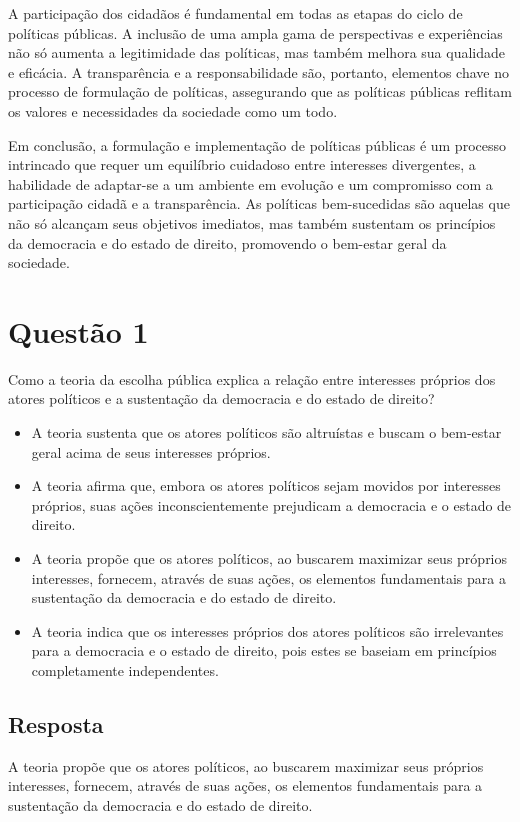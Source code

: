 \documentclass[
   article,       
   12pt,          
   oneside,       
   a4paper,       
   english,       
   brazil,        
   sumario=tradicional
   ]{abntex2}
\begin{document}
A participação dos cidadãos é fundamental em todas as etapas do ciclo de políticas públicas. A inclusão de uma ampla gama de perspectivas e experiências não só aumenta a legitimidade das políticas, mas também melhora sua qualidade e eficácia. A transparência e a responsabilidade são, portanto, elementos chave no processo de formulação de políticas, assegurando que as políticas públicas reflitam os valores e necessidades da sociedade como um todo.

Em conclusão, a formulação e implementação de políticas públicas é um processo intrincado que requer um equilíbrio cuidadoso entre interesses divergentes, a habilidade de adaptar-se a um ambiente em evolução e um compromisso com a participação cidadã e a transparência. As políticas bem-sucedidas são aquelas que não só alcançam seus objetivos imediatos, mas também sustentam os princípios da democracia e do estado de direito, promovendo o bem-estar geral da sociedade.
\section{Questão 1}
Como a teoria da escolha pública explica a relação entre interesses próprios dos atores políticos e a sustentação da democracia e do estado de direito?

\begin{itemize}
  \item A teoria sustenta que os atores políticos são altruístas e buscam o bem-estar geral acima de seus interesses próprios.
  \item A teoria afirma que, embora os atores políticos sejam movidos por interesses próprios, suas ações inconscientemente prejudicam a democracia e o estado de direito.
  \item A teoria propõe que os atores políticos, ao buscarem maximizar seus próprios interesses, fornecem, através de suas ações, os elementos fundamentais para a sustentação da democracia e do estado de direito.
  \item A teoria indica que os interesses próprios dos atores políticos são irrelevantes para a democracia e o estado de direito, pois estes se baseiam em princípios completamente independentes.
\end{itemize}

\subsection{Resposta}
A teoria propõe que os atores políticos, ao buscarem maximizar seus próprios interesses, fornecem, através de suas ações, os elementos fundamentais para a sustentação da democracia e do estado de direito.
\end{document}
